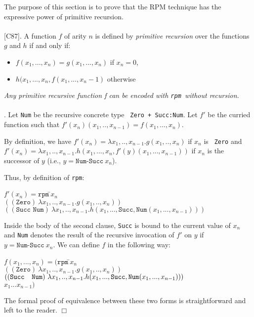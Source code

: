 \documentclass[a4paper,11pt]{article}
\newcommand{\rpm}{\texttt{rpm}}
\newcommand{\QED}{\hfill\(\Box\)}
\begin{document}
The purpose of this section is to prove that the RPM technique 
has the expressive power of primitive recursion.
~~~\\
~~~\\
 [C87]. A function $f$ of arity $n$ is
defined by \emph{primitive recursion} over the functions $g$ and $h$ if
and only if: 
\begin{itemize}
\item $f(x_1,...,x_ n) = g(x_1,...,x_n)$ if $x_n = 0$,
\item $h(x_1,...,x_n,f(x_1,...,x_n-1)$ otherwise
\end{itemize}

 \emph{Any primitive recursive function f can be
encoded with \rpm\ without recursion.}
~~\\
~~\\
. Let \texttt{Num} be the recursive concrete type {\tt
Zero + Succ:Num}. Let $f'$ be the
curried function such that $f'(x_n)(x_1,..,x_{n-1}) = f(x_1,...,x_n)$.

By definition, we have
$f'(x_n) = \lambda x_1,..,x_{n-1} . g(x_1,..,x_n)$ if $x_n$ is {\tt
Zero} and $f'(x_n) = \lambda x_1,..,x_{n-1} .
h(x_1,...,x_n,f'(y)(x_1,...,x_{n-1}))$ if $x_n$ is the successor of
$y$ (i.e., $y = \texttt{Num-Succ}~ x_n$).

Thus, by definition of \rpm:
\begin{tabbing}
$f'(x_n) = \rpm~$\=$x_n$ \\
        \>$((\texttt{Zero})~ \lambda x_1,..,x_{n-1} .
                                g(x_1,..,x_n))$ \\
        \>$((\texttt{Succ~Num})~ \lambda x_1,..,x_{n-1} .
                        h(x_1,...,\texttt{Succ},\texttt{Num}(x_1,...,x_{n-1})))$
\end{tabbing}
Inside the body of the second clause, \texttt{Succ} is bound to the
current value of $x_n$ and \texttt{Num} denotes the result of the
recursive invocation of $f'$ on $y$ if $y = \texttt{Num-Succ}~x_n$.
We can define $f$ in the following way:
\begin{tabbing}
$f(x_1,...,x_n) = (\rpm~$\=$x_n$ \\
                \>$((\texttt{Zero})~ \lambda x_1,..,x_{n-1} .
                                g(x_1,..,x_n))$ \\
                \>$((\texttt{Succ~ Num})~ \lambda x_1,..,x_{n-1} .
                                h(x_1,...,\texttt{Succ},{\tt
                                        Num}(x_1,...,x_{n-1})))$ \\
                \> $x_1 ... x_{n-1})$
\end{tabbing}
The formal proof of equivalence between these two forms is
straightforward and left to the reader. \QED
\end{document}
